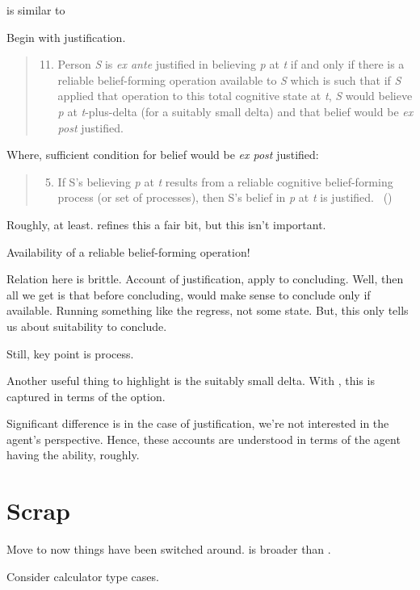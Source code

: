 \begin{note}
  \citeauthor{Turri:2010aa} is similar to \citeauthor{Goldman:1979ui}

  Begin with justification.

  \begin{quote}
    \begin{enumerate}[label=(\arabic*)]
      \setcounter{enumi}{10}
    \item
      Person \emph{S} is \emph{ex ante} justified in believing \emph{p} at \emph{t} if and only if there is a reliable belief-forming operation available to \emph{S} which is such that if \emph{S} applied that operation to this total cognitive state at \emph{t}, \emph{S} would believe \emph{p} at \emph{t}-plus-delta (for a suitably small delta) and that belief would be \emph{ex post} justified.
    \end{enumerate}
  \end{quote}

  Where, sufficient condition for belief would be \emph{ex post} justified:
  \begin{quote}
    \begin{enumerate}[label=(\arabic*)]
      \setcounter{enumi}{4}
    \item
      If S's believing \emph{p} at \emph{t} results from a reliable cognitive belief-forming process (or set of processes), then S's belief in \emph{p} at \emph{t} is justified.%
      \mbox{ }\hfill\mbox{(\citeyear[13]{Goldman:1979ui})}
    \end{enumerate}
  \end{quote}
  Roughly, at least.
  \citeauthor{Goldman:1979ui} refines this a fair bit, but this isn't important.

  Availability of a reliable belief-forming operation!

  Relation here is brittle.
  Account of justification, apply to concluding.
  Well, then all we get is that before concluding, would make sense to conclude only if available.
  Running something like the \citeauthor{Carroll:1895uj} regress, not some state.
  But, this only tells us about suitability to conclude.

  Still, key point is process.

  Another useful thing to highlight is the suitably small delta.
  With \requ{}, this is captured in terms of the option.
\end{note}

\begin{note}
  Significant difference is in the case of justification, we're not interested in the agent's perspective.
  Hence, these accounts are understood in terms of the agent having the ability, roughly.
\end{note}

\section{Scrap}

\begin{note}
  {
    \color{red}
    Move to \requ{} now things have been switched around.
  }
  \fc{} is broader than \requ{}.

  Consider calculator type cases.
\end{note}


